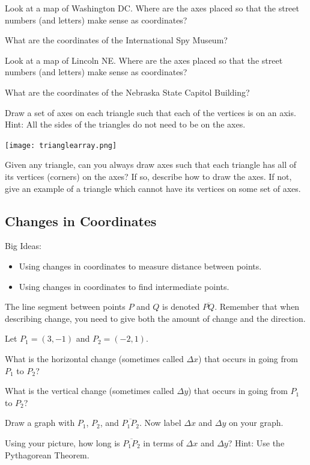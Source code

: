 \bq\label{cq} \be
\item  Look at a map of Washington DC. Where are the axes placed so that the street numbers (and letters) make sense as coordinates?
\item What are the coordinates of the International Spy Museum?
\ee \eq

\bq \be
\item  Look at a map of Lincoln NE. Where are the axes placed so that the street numbers (and letters) make sense as coordinates?
\item What are the coordinates of the Nebraska State Capitol Building?
\ee \eq

\bq Draw a set of axes on each triangle such that each of the vertices is on an axis. Hint: All the sides of the triangles do not need to be on the axes.

\texttt{[image: trianglearray.png]}
\eq

\bq\label{q2} Given any triangle, can you always draw axes such that each triangle has all of its vertices (corners) on the axes? If so, describe how to draw the axes. If not, give an example of a triangle which cannot have its vertices on some set of axes.
\eq
\subsection{Changes in Coordinates}
Big Ideas:
\begin{itemize}
\item Using changes in coordinates to measure distance between points.
\item Using changes in coordinates to find intermediate points.
\end{itemize}
\begin{info} The line segment between points $P$ and $Q$ is denoted $\overline{PQ}$. Remember that when describing change, you need to give both the amount of change and the direction. \end{info}

\bq Let $P_1=(3,-1)$ and $P_2=(-2,1)$.
\be
\item What is the horizontal change (sometimes called $\Delta x$) that occurs in going from $P_1$ to $P_2$?
\item What is the vertical change (sometimes called $\Delta y$) that occurs in going from $P_1$ to $P_2$?
\item Draw a graph with $P_1$, $P_2$, and $\overline{P_1 P_2}$. Now label $\Delta x$ and $\Delta y$ on your graph.
\item Using your picture, how long is $\overline{P_1 P_2}$ in terms of $\Delta x$ and $\Delta y$? Hint: Use the Pythagorean Theorem.
\ee
\eq

